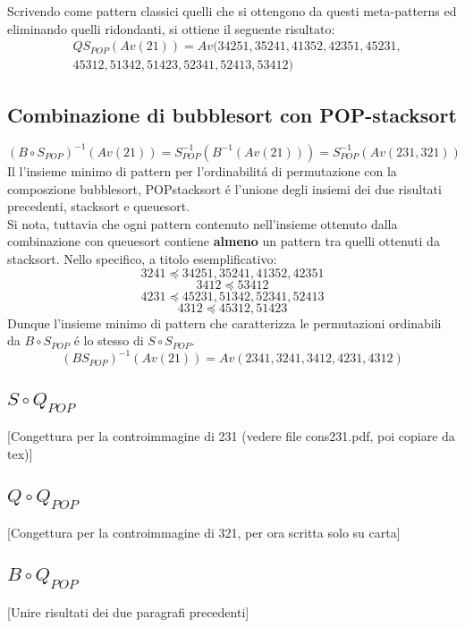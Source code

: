 Scrivendo come pattern classici quelli che si ottengono da questi meta-patterns ed eliminando quelli ridondanti, si ottiene il seguente risultato:
\begin{eqnarray*}
&Q{S_{POP}}(Av(21)) = Av(34251, 35241, 41352, 42351, 45231, \\
& 45312, 51342, 51423, 52341, 52413, 53412)
\end{eqnarray*}
\subsection*{Combinazione di {bubblesort} con {POP-stacksort}}
$$(B\circ{S}_{POP})^{-1}(Av(21)) = S_{POP}^{-1}(B^{-1}(Av(21))) = S_{POP}^{-1}(Av(231,321))$$
Il l'insieme minimo di pattern per l'ordinabilit\'a di permutazione con la composzione bubblesort, POPstacksort \'e l'unione degli insiemi dei due risultati precedenti, stacksort e queuesort.\\
Si nota, tuttavia che ogni pattern contenuto nell'insieme ottenuto dalla combinazione con queuesort contiene \textbf{almeno} un pattern tra quelli ottenuti da stacksort. Nello specifico, a titolo esemplificativo:$$3241\preceq34251, 35241, 41352, 42351$$$$3412\preceq53412$$$$4231\preceq45231, 51342, 52341, 52413$$$$4312\preceq45312, 51423$$ 
Dunque l'insieme minimo di pattern che caratterizza le permutazioni ordinabili da $B\circ{S}_{POP}$ \'e lo stesso di $S\circ{S}_{POP}$.
$$(B{S_{POP}})^{-1}(Av(21)) = Av(2341, 3241, 3412, 4231, 4312)$$
\subsection*{$S\circ{Q_{POP}}$}
[Congettura per la controimmagine di 231 (vedere file cons231.pdf, poi copiare da tex)]
\subsection*{$Q\circ{Q_{POP}}$}
[Congettura per la controimmagine di 321, per ora scritta solo su carta]
\subsection*{$B\circ{Q_{POP}}$}
[Unire risultati dei due paragrafi precedenti]
